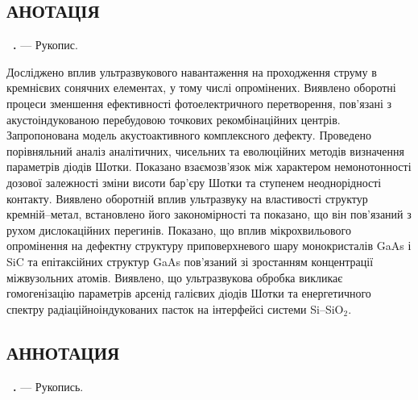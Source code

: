 \begin{center}
\section*{\MakeUppercase{анотація}}
\end{center}
\textbf{\thesisAuthorFIO~\thesisTitle.} --- Рукопис.

\abstractBegin

Досліджено вплив ультразвукового навантаження на проходження струму в кремнієвих сонячних елементах,
 у тому числі опромінених.
 Виявлено оборотні процеси зменшення ефективності фотоелектричного перетворення,
 пов'язані з акустоіндукованою перебудовою точкових рекомбінаційних центрів.
 Запропонована модель акустоактивного комплексного дефекту.
 Проведено порівняльний аналіз аналітичних, чисельних та еволюційних методів визначення параметрів діодів Шотки.
 Показано взаємозв'язок між характером немонотонності дозової залежності зміни висоти бар'єру Шотки та ступенем неоднорідності контакту.
 Виявлено оборотній вплив ультразвуку на властивості структур кремній--метал, встановлено його закономірності
 та показано, що він пов'язаний з рухом дислокаційних перегинів.
 Показано, що вплив мікрохвильового опромінення на дефектну структуру приповерхневого шару монокристалів GaAs і SiC та епітаксійних структур GaAs
 пов'язаний зі зростанням концентрації міжвузольних атомів.
 Виявлено, що ультразвукова обробка викликає гомогенізацію параметрів арсенід галієвих діодів Шотки та енергетичного спектру радіаційноіндукованих пасток  на інтерфейсі системи  Si--SiO$_2$.

\keywords


\begin{center}
{\section*{\MakeUppercase{АННОТАЦИЯ}}}
\end{center}
\textbf{\thesisAuthorFIOru~\thesisTitleRu.} --- Рукопись.

\abstractBeginRu

